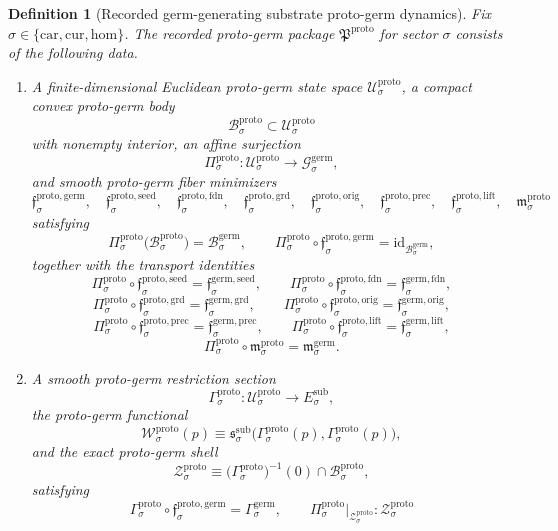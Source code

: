 \documentclass[11pt]{article}
\newcommand{\Car}{\mathrm{car}}
\newcommand{\Cur}{\mathrm{cur}}
\newcommand{\Hom}{\mathrm{hom}}
\newcommand{\SubTarget}[1]{E_{#1}^{\mathrm{sub}}}
\newcommand{\SubPair}[1]{\mathfrak s_{#1}^{\mathrm{sub}}}
\newcommand{\GermSpace}[1]{\mathcal G_{#1}^{\mathrm{germ}}}
\newcommand{\GermBody}[1]{\mathcal B_{#1}^{\mathrm{germ}}}
\newcommand{\GermSeedMin}[1]{\mathfrak f_{#1}^{\mathrm{germ,seed}}}
\newcommand{\GermFoundMin}[1]{\mathfrak f_{#1}^{\mathrm{germ,fdn}}}
\newcommand{\GermGroundMin}[1]{\mathfrak f_{#1}^{\mathrm{germ,grd}}}
\newcommand{\GermOrigMin}[1]{\mathfrak f_{#1}^{\mathrm{germ,orig}}}
\newcommand{\GermPrecMin}[1]{\mathfrak f_{#1}^{\mathrm{germ,prec}}}
\newcommand{\GermLiftMin}[1]{\mathfrak f_{#1}^{\mathrm{germ,lift}}}
\newcommand{\GermSubMin}[1]{\mathfrak m_{#1}^{\mathrm{germ}}}
\newcommand{\GermSection}[1]{\Gamma_{#1}^{\mathrm{germ}}}
\newcommand{\ProtoPackage}{\mathfrak P^{\mathrm{proto}}}
\newcommand{\ProtoSpace}[1]{\mathcal U_{#1}^{\mathrm{proto}}}
\newcommand{\ProtoBody}[1]{\mathcal B_{#1}^{\mathrm{proto}}}
\newcommand{\ProtoProj}[1]{\Pi_{#1}^{\mathrm{proto}}}
\newcommand{\ProtoGermMin}[1]{\mathfrak f_{#1}^{\mathrm{proto,germ}}}
\newcommand{\ProtoSeedMin}[1]{\mathfrak f_{#1}^{\mathrm{proto,seed}}}
\newcommand{\ProtoFoundMin}[1]{\mathfrak f_{#1}^{\mathrm{proto,fdn}}}
\newcommand{\ProtoGroundMin}[1]{\mathfrak f_{#1}^{\mathrm{proto,grd}}}
\newcommand{\ProtoOrigMin}[1]{\mathfrak f_{#1}^{\mathrm{proto,orig}}}
\newcommand{\ProtoPrecMin}[1]{\mathfrak f_{#1}^{\mathrm{proto,prec}}}
\newcommand{\ProtoLiftMin}[1]{\mathfrak f_{#1}^{\mathrm{proto,lift}}}
\newcommand{\ProtoSubMin}[1]{\mathfrak m_{#1}^{\mathrm{proto}}}
\newcommand{\ProtoSection}[1]{\Gamma_{#1}^{\mathrm{proto}}}
\newcommand{\ProtoFunctional}[1]{\mathscr W_{#1}^{\mathrm{proto}}}
\newcommand{\ProtoShellSet}[1]{\mathcal Z_{#1}^{\mathrm{proto}}}
\newtheorem{definition}{Definition}
\begin{document}
\begin{definition}[Recorded germ-generating substrate proto-germ dynamics]
\label{def:proto}
Fix \(\sigma\in\{\Car,\Cur,\Hom\}\). The recorded proto-germ package \(\ProtoPackage\) for sector \(\sigma\) consists of the following data.
\begin{enumerate}
    \item A finite-dimensional Euclidean proto-germ state space \(\ProtoSpace{\sigma}\), a compact convex proto-germ body
    \[
    \ProtoBody{\sigma}\subset\ProtoSpace{\sigma}
    \]
    with nonempty interior, an affine surjection
    \[
    \ProtoProj{\sigma}:\ProtoSpace{\sigma}\to\GermSpace{\sigma},
    \]
    and smooth proto-germ fiber minimizers
    \[
    \ProtoGermMin{\sigma},\quad
    \ProtoSeedMin{\sigma},\quad
    \ProtoFoundMin{\sigma},\quad
    \ProtoGroundMin{\sigma},\quad
    \ProtoOrigMin{\sigma},\quad
    \ProtoPrecMin{\sigma},\quad
    \ProtoLiftMin{\sigma},\quad
    \ProtoSubMin{\sigma}
    \]
    satisfying
    \[
    \ProtoProj{\sigma}\bigl(\ProtoBody{\sigma}\bigr)=\GermBody{\sigma},
    \qquad
    \ProtoProj{\sigma}\circ\ProtoGermMin{\sigma}
    =
    \mathrm{id}_{\GermBody{\sigma}},
    \]
    together with the transport identities
    \[
    \ProtoProj{\sigma}\circ\ProtoSeedMin{\sigma}
    =
    \GermSeedMin{\sigma},
    \qquad
    \ProtoProj{\sigma}\circ\ProtoFoundMin{\sigma}
    =
    \GermFoundMin{\sigma},
    \]
    \[
    \ProtoProj{\sigma}\circ\ProtoGroundMin{\sigma}
    =
    \GermGroundMin{\sigma},
    \qquad
    \ProtoProj{\sigma}\circ\ProtoOrigMin{\sigma}
    =
    \GermOrigMin{\sigma},
    \]
    \[
    \ProtoProj{\sigma}\circ\ProtoPrecMin{\sigma}
    =
    \GermPrecMin{\sigma},
    \qquad
    \ProtoProj{\sigma}\circ\ProtoLiftMin{\sigma}
    =
    \GermLiftMin{\sigma},
    \]
    \[
    \ProtoProj{\sigma}\circ\ProtoSubMin{\sigma}
    =
    \GermSubMin{\sigma}.
    \]
    \item A smooth proto-germ restriction section
    \[
    \ProtoSection{\sigma}:\ProtoSpace{\sigma}\to\SubTarget{\sigma},
    \]
    the proto-germ functional
    \[
    \ProtoFunctional{\sigma}(p)
    \equiv
    \SubPair{\sigma}\bigl(\ProtoSection{\sigma}(p),\ProtoSection{\sigma}(p)\bigr),
    \]
    and the exact proto-germ shell
    \[
    \ProtoShellSet{\sigma}
    \equiv
    \bigl(\ProtoSection{\sigma}\bigr)^{-1}(0)\cap\ProtoBody{\sigma},
    \]
    satisfying
    \[
    \ProtoSection{\sigma}\circ\ProtoGermMin{\sigma}
    =
    \GermSection{\sigma},
    \qquad
    \ProtoProj{\sigma}\big|_{\ProtoShellSet{\sigma}}
    :
    \ProtoShellSet{\sigma}
\]
\end{enumerate}
\end{definition}
\end{document}
